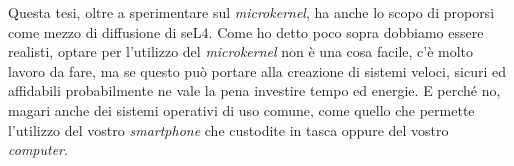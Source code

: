 Questa tesi, oltre a sperimentare sul \textit{microkernel}, ha anche lo scopo di proporsi come mezzo di diffusione di seL4. Come ho detto poco sopra dobbiamo essere realisti, optare per l'utilizzo del \textit{microkernel} non è una cosa facile, c'è molto lavoro da fare, ma se questo può portare alla creazione di sistemi veloci, sicuri ed affidabili probabilmente ne vale la pena investire tempo ed energie. E perché no, magari anche dei sistemi operativi di uso comune, come quello che permette l'utilizzo del vostro \textit{smartphone} che custodite in tasca oppure del vostro \textit{computer}.
